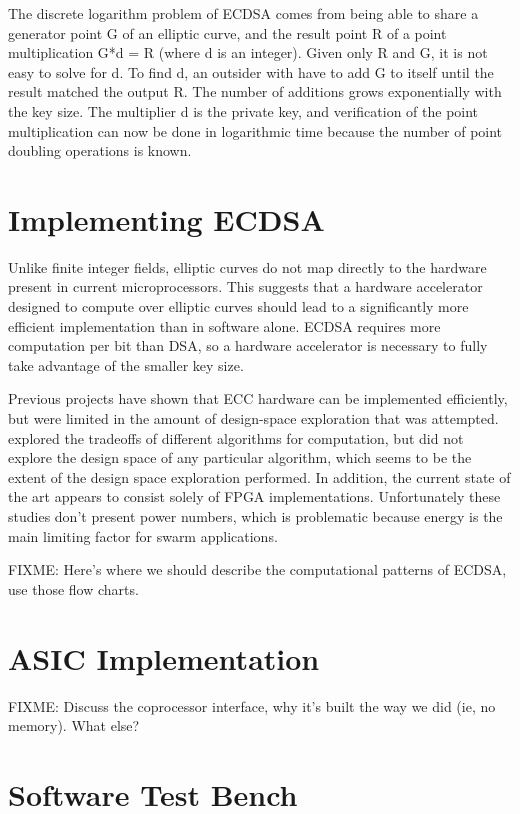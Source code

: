 \documentclass[twocolumn]{article}
\begin{document}
The discrete logarithm problem of ECDSA comes from being able to share a generator point
G of an elliptic curve, and the result point R of a point multiplication G*d = R 
(where d is an integer). Given only R and G, it is not easy to solve for d. To find d, an
outsider with have to add G to itself until the result matched the output R. The number
of additions grows exponentially with the key size. The multiplier d is the private key, 
and verification of the point multiplication can now be done in logarithmic time because
the number of point doubling operations is known. 

\section{Implementing ECDSA}

Unlike finite integer fields, elliptic curves do not map directly to
the hardware present in current microprocessors\cite{kss-ecdsa}. This
suggests that a hardware accelerator designed to compute over elliptic
curves should lead to a significantly more efficient implementation
than in software alone.  ECDSA requires more computation per bit than
DSA, so a hardware accelerator is necessary to fully take advantage of
the smaller key size.

Previous projects\cite{nnll-ecdsa_hw} have shown that ECC hardware can
be implemented efficiently, but were limited in the amount of
design-space exploration that was attempted.  \cite{mmm-hw_ecc}
explored the tradeoffs of different algorithms for computation, but
did not explore the design space of any particular algorithm, which
seems to be the extent of the design space exploration performed.  In
addition, the current state of the art appears to consist solely of
FPGA implementations.  Unfortunately these studies don't present power
numbers, which is problematic because energy is the main limiting
factor for swarm applications.

FIXME: Here's where we should describe the computational patterns of
ECDSA, use those flow charts.

\section{ASIC Implementation}

FIXME: Discuss the coprocessor interface, why it's built the way we
did (ie, no memory).  What else?

\section{Software Test Bench}
\end{document}
